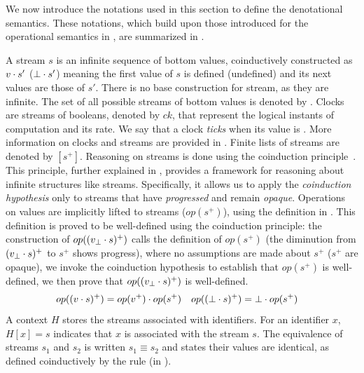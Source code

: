 We now introduce the notations used in this section to define the denotational semantics. These
notations, which build upon those introduced for the operational semantics in
, are summarized in .

A stream $s$ is an infinite sequence of bottom values, coinductively constructed as
$v \cdot s'$ (\resp $\bot \cdot s'$) meaning the first value of $s$ is defined (\resp undefined) and
its next values are those of $s'$. There is no base construction for stream, as they are infinite.
The set of all possible streams of bottom values is denoted by \Stream{\ValBot}.
%
Clocks are streams of booleans, denoted by $ck$, that represent the logical instants of computation
and its rate. We say that a clock \emph{ticks} when its value is \true. More information on clocks
and streams are provided in .
%
Finite lists of streams are denoted by $[s^+]$.
%
Reasoning on streams is done using the coinduction principle~\cite{DBLP:journals/mscs/KozenS17}.
This principle, further explained in , provides a framework
for reasoning about infinite structures like streams. Specifically, it allows us to apply the
\emph{coinduction hypothesis} only to streams that have \emph{progressed} and remain \emph{opaque}.
%
Operations on values are implicitly lifted to streams ($op(s^+)$), using the definition
in . This definition is proved to be well-defined using the
coinduction principle: the construction of $op((v_\bot \cdot s)^+)$ calls the definition of
$op(s^+)$ (the diminution from $(v_\bot \cdot s)^+$ to $s^+$ shows progress), where no assumptions
are made about $s^+$ ($s^+$ are opaque), we invoke the coinduction hypothesis to establish that
$op(s^+)$ is well-defined, we then prove that $op((v_\bot \cdot s)^+)$ is well-defined.
\begin{align}
    op((v \cdot s)^+)    & = op(v^+) \cdot op(s^+) &
    op((\bot \cdot s)^+) & = \bot \cdot op(s^+)
    \label{eq:semantics:grsync:denot:aux:lift}
\end{align}
%
A context $H$ stores the streams associated with identifiers. For an identifier $x$, $H[x] = s$
indicates that $x$ is associated with the stream $s$.
%
The equivalence of streams $s_1$ and $s_2$ is written $s_1 \equiv s_2$ and states their values are
identical, as defined coinductively by the rule 
(in ).

